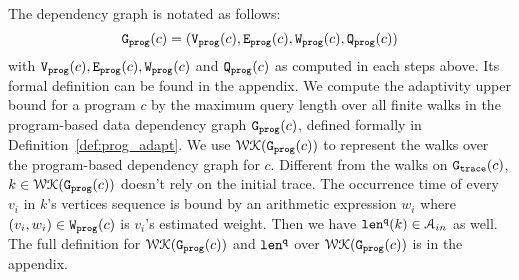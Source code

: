 
The dependency graph is notated as follows:
{
   \[
     \mathtt{{G_{prog}}}(c) = (\mathtt{{V_{prog}}}(c), \mathtt{{E_{prog}}}(c), \mathtt{{W_{prog}}}(c), \mathtt{{Q_{prog}}}(c))
     \]
 }
 with $\mathtt{{V_{prog}}}(c), \mathtt{{E_{prog}}}(c), \mathtt{{W_{prog}}}(c)$ and $ \mathtt{{Q_{prog}}}(c)$ as computed in each steps above.
 Its formal definition can be found in the appendix.
 We compute the adaptivity upper bound for a program $c$ by the maximum query length over all finite walks in the program-based data dependency graph $\mathtt{{G_{prog}}}({c})$, defined  formally in Definition~\ref{def:prog_adapt}. 
 We use $\mathcal{WK}(\mathtt{{G_{prog}}}(c))$ to represent the walks over the program-based dependency graph for $c$.
 Different from the walks on $\mathtt{{G_{trace}}}(c)$, $k \in \mathcal{WK}(\mathtt{{G_{prog}}}(c))$ doesn't rely on the initial trace.
 The occurrence time of every $v_i $ in $k$'s vertices sequence is bound by 
 an arithmetic expression $w_i$ where $(v_i, w_i) \in \mathtt{{W_{prog}}}(c)$ is $v_i$'s estimated weight. Then we have $\mathtt{len}^{\tt q}(k) \in \mathcal{A}_{in}$ as well. The full definition for $\mathcal{WK}(\mathtt{{G_{prog}}}(c))$ and $\mathtt{len}^{\tt q}$ over $\mathcal{WK}(\mathtt{{G_{prog}}}(c))$ is in the appendix.
 
 
